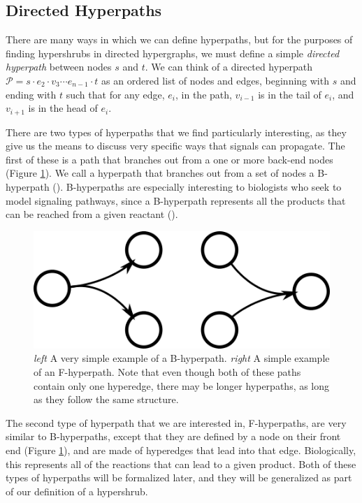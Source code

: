 \documentclass[12pt,twoside]{reedthesis}
\theoremstyle{definition}
\begin{document}
\subsection{Directed Hyperpaths}

There are many ways in which we can define hyperpaths, but for the purposes of finding hypershrubs in directed hypergraphs, we must define a simple \textit{directed hyperpath} between nodes $s$ and $t$. We can think of a directed hyperpath $\mathcal{P}=s \cdot e_2 \cdot v_3 \cdots e_{n-1} \cdot t$ as an ordered list of nodes and edges, beginning with $s$ and ending with $t$ such that for any edge, $e_i$, in the path, $v_{i-1}$ is in the tail of $e_i$, and $v_{i+1}$ is in the head of $e_i$.\par

There are two types of hyperpaths that we find particularly interesting, as they give us the means to discuss very specific ways that signals can propagate. The first of these is a path that branches out from a one or more back-end nodes (Figure \ref{fig:BF-hyperpaths}). We call a hyperpath that branches out from a set of nodes a B-hyperpath (\cite{Gallo1993}). B-hyperpaths are especially interesting to biologists who seek to model signaling pathways, since a B-hyperpath represents all the products that can be reached from a given reactant (\cite{Ritz2014}).

\begin{figure}[!h]
  \begin{center}
    \includegraphics[width=\textwidth/2]{BF-hyperpaths}
  \caption[Simple B-Hypergrah and F-Hypergraph.]{\textit{left }A very simple example of a B-hyperpath. \textit{right }A simple example of an F-hyperpath. Note that even though both of these paths contain only one hyperedge, there may be longer hyperpaths, as long as they follow the same structure.}
  \label{fig:BF-hyperpaths}
  \end{center}
\end{figure}

The second type of hyperpath that we are interested in, F-hyperpaths, are very similar to B-hyperpaths, except that they are defined by a node on their front end (Figure \ref{fig:BF-hyperpaths}), and are made of hyperedges that lead into that edge. Biologically, this represents all of the reactions that can lead to a given product. Both of these types of hyperpaths will be formalized later, and they will be generalized as part of our definition of a hypershrub.
\end{document}

